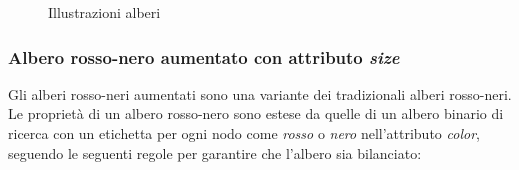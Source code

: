 \documentclass[onecolumn]{article}
\begin{document}
\begin{figure}
	\centering
	\qquad
	\caption{Illustrazioni alberi}
	\label{fig:alberi}
\end{figure}

\subsubsection{Albero rosso-nero aumentato con attributo \textit{size}}

Gli alberi rosso-neri aumentati sono una variante dei tradizionali alberi rosso-neri. Le proprietà di un albero rosso-nero sono estese da quelle di un albero binario di ricerca con un etichetta per ogni nodo come \textit{rosso} o \textit{nero} nell'attributo \textit{color}, seguendo le seguenti regole per garantire che l'albero sia bilanciato:
\end{document}
